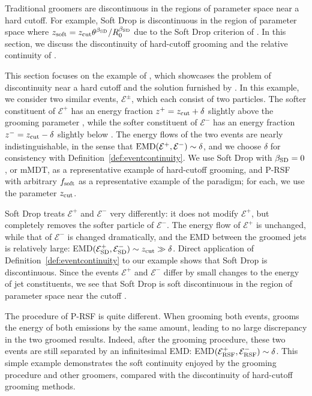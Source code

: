Traditional groomers are discontinuous in the regions of parameter space near a hard cutoff.
%
For example, Soft Drop is discontinuous in the region of parameter space where
\(
    z_{\rm soft} = z_{\rm cut} \theta^{\beta_{\rm SD}} / R_0^{\beta_{\rm SD}}
\)
due to the Soft Drop criterion of .
%
In this section, we discuss the discontinuity of hard-cutoff grooming and the relative continuity of \PIRANHA{}.

This section focuses on the example of , which showcases the problem of discontinuity near a hard cutoff and the solution furnished by \PIRANHA{}.
%
In this example, we consider two similar events, \(\mathcal{E}^\pm\), which each consist of two particles.
%
The softer constituent of \(\mathcal E^+\) has an energy fraction \(z^+ =  z_{\rm cut} + \delta\) slightly above the grooming parameter \zcut, while the softer constituent of \(\mathcal E^-\) has an energy fraction \(z^- =z_{\rm cut} - \delta\) slightly below \zcut.
%
The energy flows of the two events are nearly indistinguishable, in the sense that \(
{\rm EMD}(\mathcal{E}^+, \mathcal{E}^-)\sim\delta
\),
and we choose \(\delta\) for consistency with Definition~\ref{def:eventcontinuity}.
%
We use Soft Drop with \(\beta_{\rm SD} = 0\), or mMDT, as a representative example of hard-cutoff grooming, and P-RSF with arbitrary \(f_{\rm soft}\) as a representative example of the \PIRANHA{} paradigm;
%
for each, we use the parameter \(z_{\rm cut}\).

Soft Drop treats \(\mathcal E^+\) and \(\mathcal E^-\) very differently:
%
it does not modify \(\mathcal E^+\), but completely removes the softer particle of \(\mathcal E^-\).
%
The energy flow of \(\mathcal E^+\) is unchanged, while that of \(\mathcal E^-\) is changed dramatically, and the EMD between the groomed jets is relatively large:
EMD\(
(\mathcal{E}^+_{\rm SD},
\mathcal{E}^-_{\rm SD})
\sim z_{\rm cut}
\gg \delta\).
%
Direct application of Definition~\ref{def:eventcontinuity} to our example shows that Soft Drop is discontinuous.
%
Since the events \(\mathcal E^+\) and \(\mathcal E^-\) differ by small changes to the energy of jet constituents, we see that Soft Drop is soft discontinuous in the region of parameter space near the cutoff \zcut.

The procedure of P-RSF is quite different.
%
When grooming both events,  grooms the energy of both emissions by the same amount, leading to no large discrepancy in the two groomed results.
%
Indeed, after the  grooming procedure, these two events are still separated by an infinitesimal EMD:
EMD\((\mathcal{E}^+_{\rm RSF},
\mathcal{E}^-_{\rm RSF})\sim\delta\).
%
This simple example demonstrates the soft continuity enjoyed by the  grooming procedure and other \PIRANHA{} groomers, compared with the discontinuity of hard-cutoff grooming methods.

